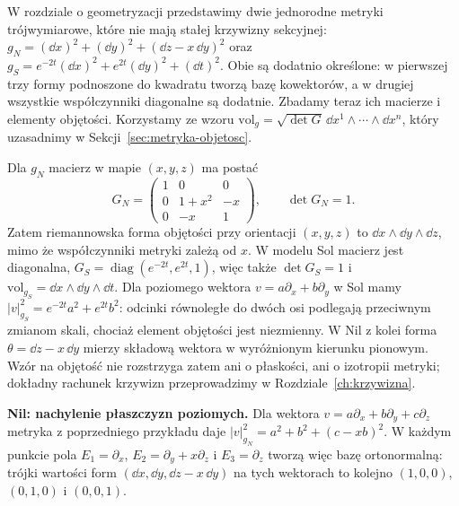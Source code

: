 \begin{przyklad}
\label{prz:thur-dop-metryki-nil-sol}
W rozdziale o geometryzacji przedstawimy dwie jednorodne metryki
trójwymiarowe, które nie mają stałej krzywizny sekcyjnej:
$g_N=(\dd x)^2+(\dd y)^2+(\dd z-x\,\dd y)^2$ oraz
$g_S=e^{-2t}(\dd x)^2+e^{2t}(\dd y)^2+(\dd t)^2$.
Obie są dodatnio określone: w pierwszej trzy formy podnoszone
do kwadratu tworzą bazę kowektorów, a w drugiej wszystkie
współczynniki diagonalne są dodatnie. Zbadamy teraz ich macierze
i elementy objętości. Korzystamy ze wzoru
$\mathrm{vol}_g=\sqrt{\det G}\,\dd x^1\wedge\cdots\wedge\dd x^n$,
który uzasadnimy w Sekcji~\ref{sec:metryka-objetosc}.

Dla $g_N$ macierz w mapie $(x,y,z)$ ma postać
\[
G_N=\begin{pmatrix}1&0&0\\0&1+x^2&-x\\0&-x&1\end{pmatrix},
\qquad \det G_N=1.
\]
Zatem riemannowska forma objętości przy orientacji $(x,y,z)$ to
$\dd x\wedge\dd y\wedge\dd z$, mimo że współczynniki metryki
zależą od $x$. W modelu Sol macierz jest diagonalna,
$G_S=\operatorname{diag}(e^{-2t},e^{2t},1)$,
więc także $\det G_S=1$ i
$\mathrm{vol}_{g_S}=\dd x\wedge\dd y\wedge\dd t$.
Dla poziomego wektora $v=a\partial_x+b\partial_y$ w Sol
mamy $|v|_{g_S}^2=e^{-2t}a^2+e^{2t}b^2$:
odcinki równoległe do dwóch osi podlegają przeciwnym zmianom
skali, chociaż element objętości jest niezmienny.
W Nil z kolei forma $\theta=\dd z-x\,\dd y$ mierzy składową
wektora w wyróżnionym kierunku pionowym.
Wzór na objętość nie rozstrzyga zatem ani o płaskości,
ani o izotropii metryki; dokładny rachunek krzywizn
przeprowadzimy w Rozdziale~\ref{ch:krzywizna}.
\end{przyklad}

\textbf{Nil: nachylenie płaszczyzn poziomych.}
Dla wektora $v=a\partial_x+b\partial_y+c\partial_z$
metryka z poprzedniego przykładu daje
$|v|_{g_N}^2=a^2+b^2+(c-xb)^2$.
W każdym punkcie pola
$E_1=\partial_x$, $E_2=\partial_y+x\partial_z$
i $E_3=\partial_z$ tworzą więc bazę ortonormalną:
trójki wartości form $(\dd x,\dd y,\dd z-x\,\dd y)$
na tych wektorach to kolejno $(1,0,0)$, $(0,1,0)$ i $(0,0,1)$.

